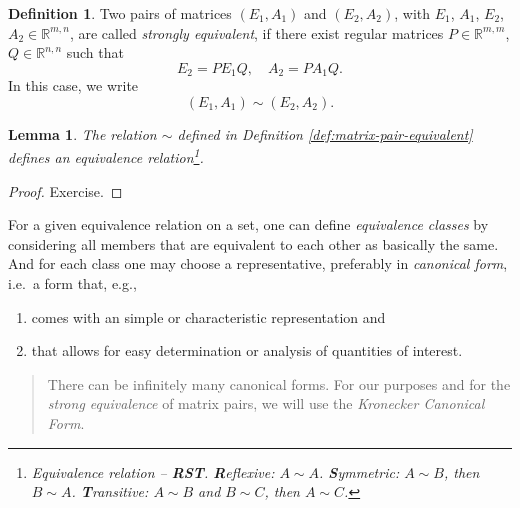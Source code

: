 \documentclass[]{book}
\providecommand{\tightlist}{%
  \setlength{\itemsep}{0pt}\setlength{\parskip}{0pt}}
\newenvironment {JHSAYS} [0] {\begin{quote}\color{jhsc}} {\end{quote}}
\newtheorem{lemma}{Lemma}[chapter]
\theoremstyle{definition}
\newtheorem{definition}{Definition}[chapter]
\theoremstyle{definition}
\theoremstyle{definition}
\theoremstyle{definition}
\theoremstyle{remark}
\begin{document}
\begin{definition}
\protect\hypertarget{def:matrix-pair-equivalent}{}{\label{def:matrix-pair-equivalent} }Two pairs of matrices \((E_1, A_1)\) and \((E_2, A_2)\), with \(E_1\), \(A_1\), \(E_2\), \(A_2 \in \mathbb R^{m,n}\), are called \emph{strongly equivalent}, if there exist regular matrices \(P\in \mathbb R^{m,m}\), \(Q\in \mathbb R^{n,n}\) such that
\begin{equation*}
E_2 = PE_1Q, \quad A_2 = PA_1Q.
\end{equation*}
In this case, we write
\[(E_1, A_1) \sim (E_2, A_2).\]
\end{definition}

\begin{lemma}
\protect\hypertarget{lem:strong-equivalence-RSI}{}{\label{lem:strong-equivalence-RSI} }The relation \(\sim\) defined in Definition \ref{def:matrix-pair-equivalent} defines an equivalence relation\footnote{Equivalence relation -- \textbf{RST}. \textbf{R}eflexive: \(A\sim A\). \textbf{S}ymmetric: \(A\sim B\), then \(B\sim A\). \textbf{T}ransitive: \(A\sim B\) and \(B\sim C\), then \(A\sim C\).}.
\end{lemma}
\begin{proof}
{}Exercise.
\end{proof}

For a given equivalence relation on a set, one can define \emph{equivalence classes} by considering all members that are equivalent to each other as basically the same. And for each class one may choose a representative, preferably in \emph{canonical form}, i.e.~a form that, e.g.,

\begin{enumerate}
\def\labelenumi{\arabic{enumi}.}
\tightlist
\item
  comes with an simple or characteristic representation and
\item
  that allows for easy determination or analysis of quantities of interest.
\end{enumerate}

\begin{JHSAYS}
There can be infinitely many canonical forms. For our purposes and for
the \emph{strong equivalence} of matrix pairs, we will use the
\emph{Kronecker Canonical Form}.
\end{JHSAYS}
\end{document}
